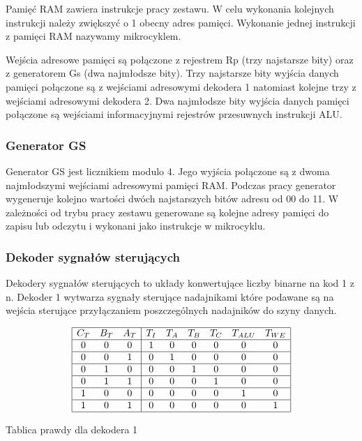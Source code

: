\documentclass[../main.tex]{subfiles}
\begin{document}
        Pamięć RAM zawiera instrukcje pracy zestawu. W celu wykonania kolejnych instrukcji należy zwiększyć o 1
        obecny adres pamięci. Wykonanie jednej instrukcji z pamięci RAM nazywamy mikrocyklem.
        \par
        Wejścia adresowe pamięci są połączone z rejestrem Rp (trzy najstarsze bity) oraz z generatorem Gs (dwa najmłodsze bity). 
        Trzy najstarsze bity wyjścia danych pamięci połączone są z wejściami adresowymi dekodera 1 natomiast kolejne trzy z wejściami 
        adresowymi dekodera 2. Dwa najmłodsze bity wyjścia danych pamięci połączone są wejściami informacyjnymi rejestrów przesuwnych instrukcji ALU.

        \subsubsection*{Generator GS}
        
        Generator GS jest licznikiem modulo 4. Jego wyjścia połączone są z dwoma najmłodszymi wejściami adresowymi pamięci RAM. Podczas pracy
        generator wygeneruje kolejno wartości dwóch najstarszych bitów adresu od 00 do 11. W zależności od trybu pracy zestawu generowane są
        kolejne adresy pamięci do zapisu lub odczytu i wykonani jako instrukcje w mikrocyklu.

        \subsubsection*{Dekoder sygnałów sterujących}
        
        Dekodery sygnałów sterujących to układy konwertujące liczby binarne na kod 1 z n. Dekoder 1 wytwarza sygnały sterujące nadajnikami które
        podawane są na wejścia sterujące przyłączaniem poszczególnych nadajników do szyny danych.

        \begin{table}[ht]
            \centering
            \[
            \begin{array}{|ccc|cccccc|}
            \hline
            C_T & B_T & A_T & T_I & T_A & T_B & T_C & T_{ALU} & T_{WE} \\ \hline
            0   & 0   & 0   & 1   & 0   & 0   & 0   & 0       & 0     \\ \hline
            0   & 0   & 1   & 0   & 1   & 0   & 0   & 0       & 0     \\ \hline
            0   & 1   & 0   & 0   & 0   & 1   & 0   & 0       & 0     \\ \hline
            0   & 1   & 1   & 0   & 0   & 0   & 1   & 0       & 0     \\ \hline
            1   & 0   & 0   & 0   & 0   & 0   & 0   & 1       & 0     \\ \hline
            1   & 0   & 1   & 0   & 0   & 0   & 0   & 0       & 1     \\ \hline
            \end{array}
            \]
            \caption{Tablica prawdy dla dekodera 1}
            \label{tab:nadajniki}
        \end{table}
\end{document}
